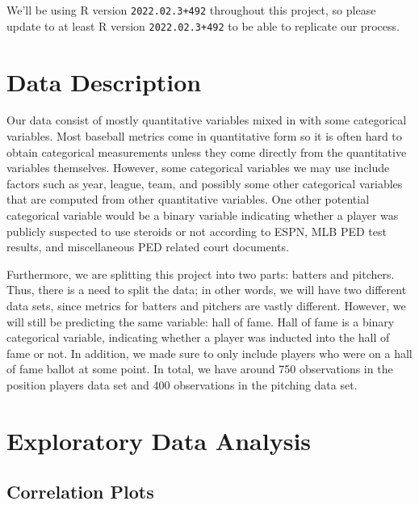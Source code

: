 \documentclass[
]{article}
\begin{document}
We'll be using R version \texttt{2022.02.3+492} throughout this project,
so please update to at least R version \texttt{2022.02.3+492} to be able
to replicate our process.

\hypertarget{data-description}{%
\section{Data Description}\label{data-description}}

Our data consist of mostly quantitative variables mixed in with some
categorical variables. Most baseball metrics come in quantitative form
so it is often hard to obtain categorical measurements unless they come
directly from the quantitative variables themselves. However, some
categorical variables we may use include factors such as year, league,
team, and possibly some other categorical variables that are computed
from other quantitative variables. One other potential categorical
variable would be a binary variable indicating whether a player was
publicly suspected to use steroids or not according to ESPN, MLB PED
test results, and miscellaneous PED related court documents.

Furthermore, we are splitting this project into two parts: batters and
pitchers. Thus, there is a need to split the data; in other words, we
will have two different data sets, since metrics for batters and
pitchers are vastly different. However, we will still be predicting the
same variable: hall of fame. Hall of fame is a binary categorical
variable, indicating whether a player was inducted into the hall of fame
or not. In addition, we made sure to only include players who were on a
hall of fame ballot at some point. In total, we have around 750
observations in the position players data set and 400 observations in
the pitching data set.

\hypertarget{exploratory-data-analysis}{%
\section{Exploratory Data Analysis}\label{exploratory-data-analysis}}

\hypertarget{correlation-plots}{%
\subsection{Correlation Plots}\label{correlation-plots}}
\end{document}
